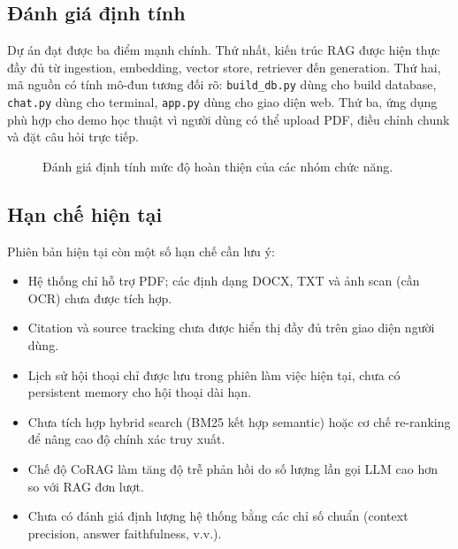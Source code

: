 \documentclass[10pt, conference, a4paper, compsocconf]{IEEEtran}
\begin{document}
\subsection{Đánh giá định tính}
Dự án đạt được ba điểm mạnh chính. Thứ nhất, kiến trúc RAG được hiện thực đầy đủ từ ingestion, embedding, vector store, retriever đến generation. Thứ hai, mã nguồn có tính mô-đun tương đối rõ: \texttt{build\_db.py} dùng cho build database, \texttt{chat.py} dùng cho terminal, \texttt{app.py} dùng cho giao diện web. Thứ ba, ứng dụng phù hợp cho demo học thuật vì người dùng có thể upload PDF, điều chỉnh chunk và đặt câu hỏi trực tiếp.
\begin{figure}[ht]
\centering
{}
\caption{Đánh giá định tính mức độ hoàn thiện của các nhóm chức năng.}
\label{fig:quality}
\end{figure}

\subsection{Hạn chế hiện tại}
Phiên bản hiện tại còn một số hạn chế cần lưu ý:
\begin{itemize}
    \item Hệ thống chỉ hỗ trợ PDF; các định dạng DOCX, TXT và ảnh scan (cần OCR) chưa được tích hợp.
    \item Citation và source tracking chưa được hiển thị đầy đủ trên giao diện người dùng.
    \item Lịch sử hội thoại chỉ được lưu trong phiên làm việc hiện tại, chưa có persistent memory cho hội thoại dài hạn.
    \item Chưa tích hợp hybrid search (BM25 kết hợp semantic) hoặc cơ chế re-ranking để nâng cao độ chính xác truy xuất.
    \item Chế độ CoRAG làm tăng độ trễ phản hồi do số lượng lần gọi LLM cao hơn so với RAG đơn lượt.
    \item Chưa có đánh giá định lượng hệ thống bằng các chỉ số chuẩn (context precision, answer faithfulness, v.v.).
\end{itemize}
\end{document}

